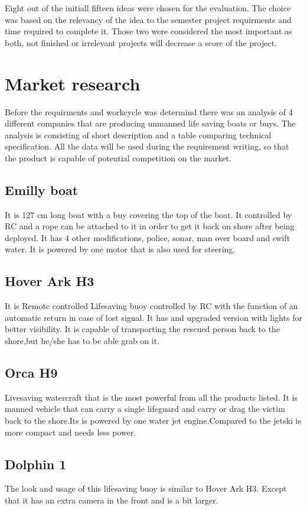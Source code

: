 Eight out of the initiall fifteen ideas were chosen for the evaluation. 
The choice was based on the relevancy of the idea to the semester project requirments 
and time required to complete it. Those two were considered the most 
important as both, not finished or irrelevant projects will decrease a score 
of the project.

\newpage

\section{Market research}
Before the requirments and workcycle was determind  there was an analysis of  4 different companies that are producing unmanned life saving boats or buys. The analysis is consisting of short description and a table comparing technical specification. All the data will be used during the requirement writing, so that the product is capable of potential competition on the market.
\subsection{Emilly boat }
It is 127 cm long boat with a buy covering the top of the boat. It controlled by RC and a rope can be attached to it in order to get it back on shore after being deployed. It has 4 other modifications, police, sonar, man over board and swift water. It is powered by one motor that is also used for steering.
\subsection{Hover Ark H3}
It is Remote controlled Lifesaving buoy controlled by RC with the function of an automatic return in case of lost signal. It has and upgraded version with lights for better visibility. It is capable of transporting the rescued person back to the shore,but he/she has to be able grab on it. 
\subsection{Orca H9}
Livesaving watercraft that is the most powerful from all the products listed. It is manned vehicle that can carry a single lifeguard and carry or drag the victim back to the shore.Its is powered by one water jet engine.Compared to the jetski is more compact and needs less power.
\subsection{Dolphin 1}
The look and usage of this lifesaving buoy is similar to Hover Ark H3. Except that it has an extra camera in the front and is a bit larger.
